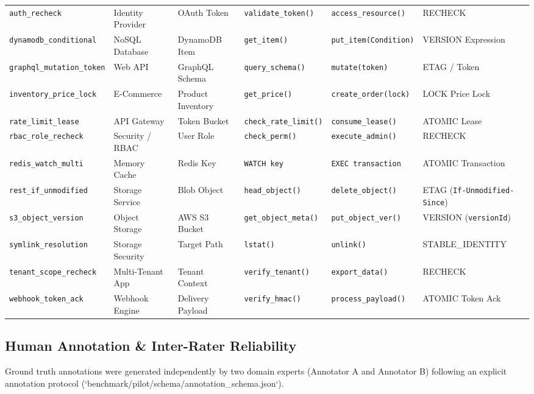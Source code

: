\begin{table}[t]
{\begin{tabular}{llllll}
\texttt{auth\_recheck} & Identity Provider & OAuth Token & \texttt{validate\_token()} & \texttt{access\_resource()} & \textsf{RECHECK} \\
\texttt{dynamodb\_conditional} & NoSQL Database & DynamoDB Item & \texttt{get\_item()} & \texttt{put\_item(Condition)} & \textsf{VERSION} Expression \\
\texttt{graphql_mutation_token} & Web API & GraphQL Schema & \texttt{query\_schema()} & \texttt{mutate(token)} & \textsf{ETAG} / Token \\
\texttt{inventory\_price\_lock} & E-Commerce & Product Inventory & \texttt{get\_price()} & \texttt{create\_order(lock)} & \textsf{LOCK} Price Lock \\
\texttt{rate\_limit\_lease} & API Gateway & Token Bucket & \texttt{check\_rate\_limit()} & \texttt{consume\_lease()} & \textsf{ATOMIC} Lease \\
\texttt{rbac\_role\_recheck} & Security / RBAC & User Role & \texttt{check\_perm()} & \texttt{execute\_admin()} & \textsf{RECHECK} \\
\texttt{redis\_watch\_multi} & Memory Cache & Redis Key & \texttt{WATCH key} & \texttt{EXEC transaction} & \textsf{ATOMIC} Transaction \\
\texttt{rest\_if\_unmodified} & Storage Service & Blob Object & \texttt{head\_object()} & \texttt{delete\_object()} & \textsf{ETAG} (\texttt{If-Unmodified-Since}) \\
\texttt{s3\_object\_version} & Object Storage & AWS S3 Bucket & \texttt{get\_object\_meta()} & \texttt{put\_object\_ver()} & \textsf{VERSION} (\texttt{versionId}) \\
\texttt{symlink\_resolution} & Storage Security & Target Path & \texttt{lstat()} & \texttt{unlink()} & \textsf{STABLE\_IDENTITY} \\
\texttt{tenant\_scope\_recheck} & Multi-Tenant App & Tenant Context & \texttt{verify\_tenant()} & \texttt{export\_data()} & \textsf{RECHECK} \\
\texttt{webhook\_token\_ack} & Webhook Engine & Delivery Payload & \texttt{verify\_hmac()} & \texttt{process\_payload()} & \textsf{ATOMIC} Token Ack \\
\bottomrule
\end{tabular}%
}
\end{table}

\subsection{Human Annotation \& Inter-Rater Reliability}
Ground truth annotations were generated independently by two domain experts (Annotator A and Annotator B) following an explicit annotation protocol (`benchmark/pilot/schema/annotation_schema.json`).

